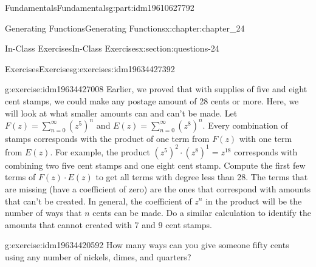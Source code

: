 \documentclass[oneside,10pt,]{book}
\numberwithin{equation}{section}
\begin{document}
\begin{partptx}{Fundamentals}{}{Fundamentals}{}{}{g:part:idm19610627792}
\begin{chapterptx}{Generating Functions}{}{Generating Functions}{}{}{x:chapter:chapter_24}
\begin{sectionptx}{In-Class Exercises}{}{In-Class Exercises}{}{}{x:section:questions-24}
\begin{exercises-subsection-numberless}{Exercises}{}{Exercises}{}{}{g:exercises:idm19634427392}
\begin{exercisegroup}
\begin{divisionexerciseeg}{2}{}{}{g:exercise:idm19634427008}%
Earlier, we proved that with supplies of five and eight cent stamps, we could make any postage amount of 28 cents or more.  Here, we will look at what smaller amounts can and can't be made.  Let \(F(z)= \sum_{n=0}^{\infty} (z^{5})^n\) and \(E(z)=\sum_{n=0}^{\infty} (z^{8})^n\).  Every combination of stamps corresponds with the product of one term from \(F(z)\) with one term from \(E(z)\).  For example, the product \((z^{5})^{2}\cdot (z^{8})^1= z^{18}\)  corresponds with combining two five cent stamps and one eight cent stamp.  Compute the first few terms of \(F(z)\cdot E(z)\) to  get all terms with degree less than 28. The terms that are missing (have a coefficient of zero) are the ones that correspond with amounts that can't be created.  In general, the coefficient of \(z^n\) in the product will be the number of ways that \(n\) cents can be made. Do a similar calculation to identify the amounts that cannot created with 7 and 9 cent stamps.%
\end{divisionexerciseeg}%
\begin{divisionexerciseeg}{3}{}{}{g:exercise:idm19634420592}%
How many ways can you give someone fifty cents using any number of nickels, dimes, and quarters?%
\end{divisionexerciseeg}%
\end{exercisegroup}
\par\medskip\noindent
\end{exercises-subsection-numberless}
\end{sectionptx}
\end{chapterptx}
\end{partptx}
%
%
\typeout{************************************************}
\typeout{************************************************}
%
\end{document}
